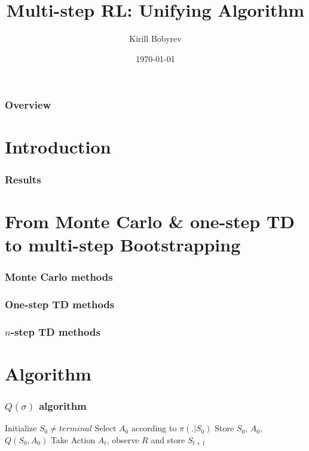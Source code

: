 \documentclass{beamer}
\title{Multi-step RL: Unifying Algorithm}
\author{Kirill Bobyrev}
\date{\today}
\begin{document}
\begin{frame}
\titlepage
\end{frame}

\begin{frame}
\frametitle{Overview}
\tableofcontents
\end{frame}


\section{Introduction}

\begin{frame}
  \frametitle{Results}
\end{frame}

\section{From Monte Carlo & one-step TD to multi-step Bootstrapping}

\begin{frame}
  \frametitle{Monte Carlo methods}
\end{frame}

\begin{frame}
  \frametitle{One-step TD methods}
\end{frame}

\begin{frame}
  \frametitle{$n$-step TD methods}
\end{frame}

\section{Algorithm}

\begin{frame}
  \frametitle{$Q(\sigma)$ algorithm}
  \begin{algorithmic}
    \STATE Initialize $S_0 \neq {terminal}$
    \STATE Select $A_0$ according to $\pi(. | S_0)$
    \STATE Store $S_0$, $A_0$, $Q(S_0, A_0)$
        \STATE Take Action $A_t$, observe $R$ and store $S_{t + 1}$
      \ENDIF
    \ENDFOR
  \end{algorithmic}
\end{frame}
\end{document}
